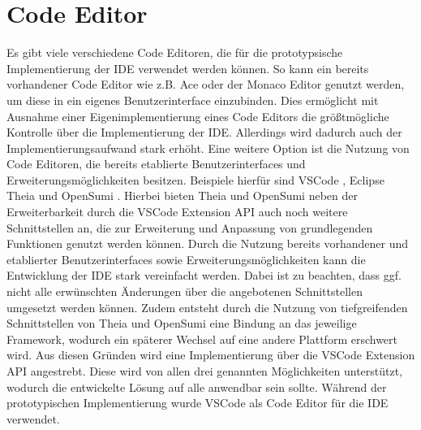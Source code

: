 \section{Code Editor}\label{section:prototypische-implementierung:code-editor}


Es gibt viele verschiedene Code Editoren, die für die prototypsische Implementierung der IDE verwendet werden können. So kann ein bereits vorhandener Code Editor wie z.B. Ace oder der Monaco Editor genutzt werden, um diese in ein eigenes Benutzerinterface einzubinden. Dies ermöglicht mit Ausnahme einer Eigenimplementierung eines Code Editors die größtmögliche Kontrolle über die Implementierung der IDE. Allerdings wird dadurch auch der Implementierungsaufwand stark erhöht. Eine weitere Option ist die Nutzung von Code Editoren, die bereits etablierte Benutzerinterfaces und Erweiterungsmöglichkeiten besitzen. Beispiele hierfür sind \ac{VSCode} \cite{noauthor_vscode_nodate}, Eclipse Theia \cite{noauthor_theia_nodate} und OpenSumi \cite{noauthor_opensumi_nodate}. Hierbei bieten Theia und OpenSumi neben der Erweiterbarkeit durch die VSCode Extension API \cite{noauthor_vscode-extension-api_nodate} auch noch weitere Schnittstellen an, die zur Erweiterung und Anpassung von grundlegenden Funktionen genutzt werden können. Durch die Nutzung bereits vorhandener und etablierter Benutzerinterfaces sowie Erweiterungsmöglichkeiten kann die Entwicklung der IDE stark vereinfacht werden. Dabei ist zu beachten, dass ggf. nicht alle erwünschten Änderungen über die angebotenen Schnittstellen umgesetzt werden können. Zudem entsteht durch die Nutzung von tiefgreifenden Schnittstellen von Theia und OpenSumi eine Bindung an das jeweilige Framework, wodurch ein späterer Wechsel auf eine andere Plattform erschwert wird. Aus diesen Gründen wird eine Implementierung über die VSCode Extension API angestrebt. Diese wird von allen drei genannten Möglichkeiten unterstützt, wodurch die entwickelte Lösung auf alle anwendbar sein sollte. Während der prototypischen Implementierung wurde \ac{VSCode} als Code Editor für die IDE verwendet.